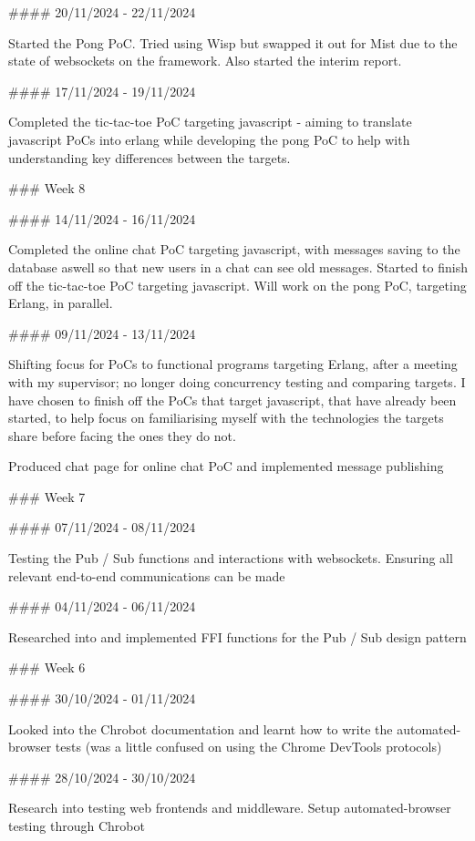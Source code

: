 \documentclass[]{interim}
\begin{document}
\begin{markdown}
  #### 20/11/2024 - 22/11/2024

  Started the Pong PoC. Tried using Wisp but swapped it out for Mist due to the
  state of websockets on the framework. Also started the interim report.

  #### 17/11/2024 - 19/11/2024

  Completed the tic-tac-toe PoC targeting javascript - aiming to translate
  javascript PoCs into erlang while developing the pong PoC to help with
  understanding key differences between the targets.

  ### Week 8

  #### 14/11/2024 - 16/11/2024

  Completed the online chat PoC targeting javascript, with messages saving to the
  database aswell so that new users in a chat can see old messages. Started to
  finish off the tic-tac-toe PoC targeting javascript. Will work on the pong PoC,
  targeting Erlang, in parallel.

  #### 09/11/2024 - 13/11/2024

  Shifting focus for PoCs to functional programs targeting Erlang, after a meeting
  with my supervisor; no longer doing concurrency testing and comparing targets. I
  have chosen to finish off the PoCs that target javascript, that have already
  been started, to help focus on familiarising myself with the technologies the
  targets share before facing the ones they do not.

  Produced chat page for online chat PoC and implemented message publishing

  ### Week 7

  #### 07/11/2024 - 08/11/2024

  Testing the Pub / Sub functions and interactions with websockets. Ensuring all
  relevant end-to-end communications can be made

  #### 04/11/2024 - 06/11/2024

  Researched into and implemented FFI functions for the Pub / Sub design pattern

  ### Week 6

  #### 30/10/2024 - 01/11/2024

  Looked into the Chrobot documentation and learnt how to write the
  automated-browser tests (was a little confused on using the Chrome DevTools
  protocols)

  #### 28/10/2024 - 30/10/2024

  Research into testing web frontends and middleware. Setup automated-browser
  testing through Chrobot


\end{markdown}
\end{document}
